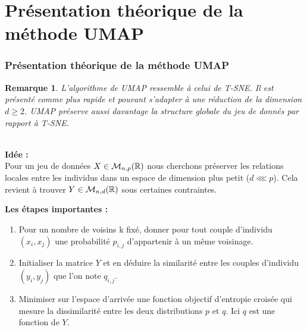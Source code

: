 \documentclass{beamer}
\newtheorem{rmq}{Remarque}
\theoremstyle{definition}
\begin{document}
\section{Présentation théorique de la méthode UMAP}
\begin{frame}
\frametitle{Présentation théorique de la méthode UMAP}
\begin{rmq}
	L'algorithme de UMAP ressemble à celui de T-SNE. Il est présenté comme plus rapide et pouvant s'adapter à une réduction de la dimension $d\geq2$. UMAP préserve aussi davantage la structure globale du jeu de donnés par rapport à T-SNE.
\end{rmq}
\quad \\[0.5cm]
	\textcolor{modernvert}{\textbf{Idée :}}\\ Pour un jeu de données $X\in\mathcal{M}_{n,p}(\mathbb{R})$ nous cherchons préserver les relations locales entre les individus dans un espace de dimension plus petit ($d \lll p$). Cela revient à trouver $Y\in\mathcal{M}_{n,d}(\mathbb{R})$ sous certaines contraintes.\\
	
	
\end{frame}

\begin{frame}
\textcolor{modernvert}{\textbf{Les étapes importantes :}}
\begin{enumerate}
	\item  Pour un nombre de voisins k fixé, donner pour tout couple d'individu $(x_i,x_j)$ une probabilité $p_{i,j}$ d'appartenir à un même voisinage.
	\item Initialiser la matrice $Y$ et en déduire la similarité entre les couples d'individu $(y_i,y_j)$ que l'on note $q_{i,j}$.
	\item Minimiser sur l'espace d'arrivée une fonction objectif d’entropie croisée qui mesure la dissimilarité entre les deux distributions $p$ et $q$. Ici $q$ est une fonction de $Y$.
\end{enumerate}	
	
\end{frame}
\end{document}
